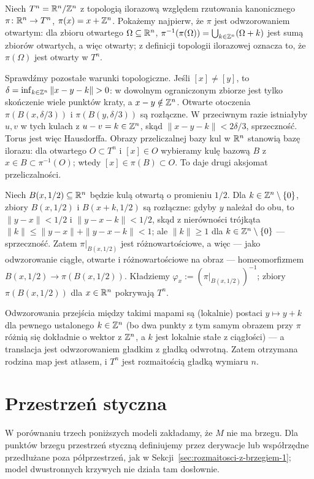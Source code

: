 \begin{przyklad}[Torus $T^n$]\label{prz:torus}
Niech $T^n=\mathbb{R}^n/\mathbb{Z}^n$ z topologią ilorazową względem rzutowania kanonicznego $\pi\colon\mathbb{R}^n
\to T^n$, $\pi(x)=x+\mathbb{Z}^n$. Pokażemy najpierw, że $\pi$ jest odwzorowaniem otwartym: dla
zbioru otwartego $\Omega\subseteq\mathbb{R}^n$, $\pi^{-1}(\pi(\Omega))=\bigcup_{k\in\mathbb{Z}^n}(\Omega+k)$
jest sumą zbiorów otwartych, a więc otwarty; z definicji topologii ilorazowej oznacza to,
że $\pi(\Omega)$ jest otwarty w $T^n$.

Sprawdźmy pozostałe warunki topologiczne. Jeśli $[x]\ne[y]$, to
$\delta=\inf_{k\in\Z^n}\|x-y-k\|>0$: w dowolnym ograniczonym
zbiorze jest tylko skończenie wiele punktów kraty, a $x-y\notin\mathbb{Z}^n$.
Otwarte otoczenia $\pi(B(x,\delta/3))$ i $\pi(B(y,\delta/3))$
są rozłączne. W przeciwnym razie istniałyby $u,v$ w tych kulach
z $u-v=k\in\mathbb{Z}^n$, skąd $\|x-y-k\|<2\delta/3$, sprzeczność.
Torus jest więc Hausdorffa. Obrazy przeliczalnej bazy kul w $\mathbb{R}^n$
stanowią bazę ilorazu: dla otwartego $O\subset T^n$ i $[x]\in O$
wybieramy kulę bazową $B$ z $x\in B\subset\pi^{-1}(O)$;
wtedy $[x]\in\pi(B)\subset O$. To daje drugi aksjomat przeliczalności.

Niech $B(x,1/2)\subseteq\mathbb{R}^n$ będzie kulą otwartą o promieniu $1/2$. Dla $k\in\mathbb{Z}^n\setminus
\{0\}$, zbiory $B(x,1/2)$ i $B(x+k,1/2)$ są rozłączne: gdyby $y$ należał do obu, to
$\|y-x\|<1/2$ i $\|y-x-k\|<1/2$, skąd z nierówności trójkąta $\|k\|\leq\|y-x\|+\|y-x-k\|<1$;
ale $\|k\|\geq1$ dla $k\in\mathbb{Z}^n\setminus\{0\}$ — sprzeczność. Zatem $\pi|_{B(x,1/2)}$ jest
różnowartościowe, a więc — jako odwzorowanie ciągłe, otwarte i różnowartościowe na obraz —
homeomorfizmem $B(x,1/2)\to\pi(B(x,1/2))$. Kładziemy $\varphi_x:=(\pi|_{B(x,1/2)})^{-1}$;
zbiory $\pi(B(x,1/2))$ dla $x\in\mathbb{R}^n$ pokrywają $T^n$.

Odwzorowania przejścia między takimi mapami są (lokalnie) postaci $y\mapsto y+k$ dla
pewnego ustalonego $k\in\mathbb{Z}^n$ (bo dwa punkty z tym samym obrazem przy $\pi$ różnią się
dokładnie o wektor z $\mathbb{Z}^n$, a $k$ jest lokalnie stałe z ciągłości) — a translacja jest
odwzorowaniem gładkim z gładką odwrotną. Zatem otrzymana rodzina map jest atlasem, i $T^n$
jest rozmaitością gładką wymiaru $n$.
\end{przyklad}
\section{Przestrzeń styczna}\label{sec:przestrzen-styczna}

W porównaniu trzech poniższych modeli zakładamy,
że $M$ nie ma brzegu. Dla punktów brzegu
przestrzeń styczną definiujemy przez derywacje
lub współrzędne przedłużane poza półprzestrzeń,
jak w Sekcji~\ref{sec:rozmaitosci-z-brzegiem-1};
model dwustronnych krzywych nie działa tam dosłownie.

